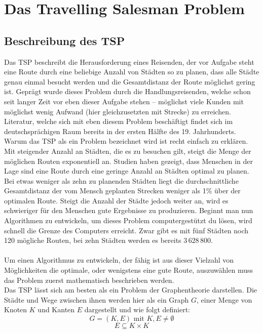 \chapter{Das Travelling Salesman Problem}
\section{Beschreibung des \ac{TSP}}
Das \ac{TSP} beschreibt die Herausforderung eines Reisenden, der vor Aufgabe steht eine Route durch eine beliebige Anzahl von Städten so zu planen, dass alle Städte genau einmal besucht werden und die Gesamtdistanz der Route möglichst gering ist.
Geprägt wurde dieses Problem durch die Handlungsreisenden, welche schon seit langer Zeit vor eben dieser Aufgabe stehen -- möglichst viele Kunden mit möglichst wenig Aufwand (hier gleichzusetzten mit Strecke) zu erreichen.
Literatur, welche sich mit eben diesem Problem beschäftigt findet sich im deutschsprächigen Raum bereits in der ersten Hälfte des 19. Jahrhunderts. \autocite[siehe Abb. 1.1, S. 3]{Applegate.2006}
Warum das \ac{TSP} als ein Problem bezeichnet wird ist recht einfach zu erklären.
Mit steigender Anzahl an Städten, die es zu besuchen gilt, steigt die Menge der möglichen Routen exponentiell an.
Studien haben gezeigt, dass Menschen in der Lage sind eine Route durch eine geringe Anzahl an Städten optimal zu planen.
Bei etwas weniger als zehn zu planenden Städten liegt die durchschnittliche Gesamtdistanz der vom Mensch geplanten Strecken weniger als 1\% über der optimalen Route. \autocite[530]{Macgregor.1996}
Steigt die Anzahl der Städte jedoch weiter an, wird es schwieriger für den Menschen gute Ergebnisse zu produzieren.
Beginnt man nun Algorithmen zu entwickeln, um dieses Problem computergestützt du lösen, wird schnell die Grenze des Computers erreicht.
Zwar gibt es mit fünf Städten noch 120 mögliche Routen, bei zehn Städten werden es bereits $3\,628\,800$.
\\\\
Um einen Algorithmus zu entwickeln, der fähig ist aus dieser Vielzahl von Möglichkeiten die optimale, oder wenigstens eine gute Route, auszuwählen muss das Problem zuerst mathematisch beschrieben werden.
\\
Das \ac{TSP} lässt sich am besten als ein Problem der Graphentheorie darstellen.
Die Städte und Wege zwischen ihnen werden hier als ein Graph $G$, einer Menge von Knoten $K$ und Kanten $E$ dargestellt und wie folgt definiert: \autocite[S. 71ff.]{Domschke.2015}
$$G=(K,E) \textrm{ mit } K,E \neq \emptyset$$
$$E \subseteq K \times K$$
